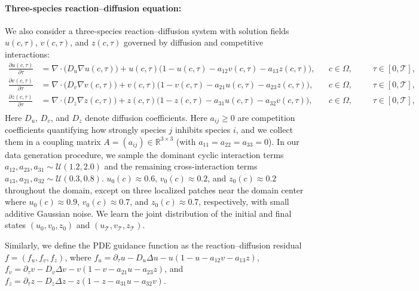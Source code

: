 \paragraph{Three-species reaction--diffusion equation:}
We also consider a three-species reaction--diffusion system with solution fields
$u(c,\tau)$, $v(c,\tau)$, and $z(c,\tau)$ governed by diffusion and competitive interactions:
\begin{equation}
\begin{aligned}
\frac{\partial u(c,\tau)}{\partial \tau} &=
\nabla\cdot\!\big(D_u \nabla u(c,\tau)\big)
+ u(c,\tau)\Big(1 - u(c,\tau) - a_{12}v(c,\tau) - a_{13}z(c,\tau)\Big),
&& c\in\Omega, &&&\tau\in[0,\mathcal{T}],\\
\frac{\partial v(c,\tau)}{\partial \tau} &=
\nabla\cdot\!\big(D_v \nabla v(c,\tau)\big)
+ v(c,\tau)\Big(1 - v(c,\tau) - a_{21}u(c,\tau) - a_{23}z(c,\tau)\Big),
&& c\in\Omega, &&&\tau\in[0,\mathcal{T}],\\
\frac{\partial z(c,\tau)}{\partial \tau} &=
\nabla\cdot\!\big(D_z \nabla z(c,\tau)\big)
+ z(c,\tau)\Big(1 - z(c,\tau) - a_{31}u(c,\tau) - a_{32}v(c,\tau)\Big),
&& c\in\Omega, &&&\tau\in[0,\mathcal{T}],\\
\end{aligned}
\label{eq:rd_3species}
\end{equation}
Here $D_u$, $D_v$, and $D_z$ denote diffusion coefficients. Here $a_{ij}\ge 0$ are competition coefficients quantifying how strongly species $j$ inhibits species $i$, and we collect them in a coupling matrix $A=(a_{ij})\in\mathbb{R}^{3\times 3}$ (with $a_{11}=a_{22}=a_{33}=0$). In our data generation procedure, we sample the dominant cyclic interaction terms $a_{12}, a_{23}, a_{31} \sim \mathcal{U}(1.2, 2.0)$ and the remaining cross-interaction terms $a_{13}, a_{21}, a_{32} \sim \mathcal{U}(0.3, 0.8)$. $u_0(c)\approx 0.6$, $v_0(c)\approx 0.2$, and $z_0(c)\approx 0.2$ throughout the domain, except on three localized patches near the domain center where $u_0(c)\approx 0.9$, $v_0(c)\approx 0.7$, and $z_0(c)\approx 0.7$, respectively, with small additive Gaussian noise. We learn the joint distribution of the initial and final states $(u_0,v_0,z_0)$ and $(u_{\mathcal{T}},v_{\mathcal{T}},z_{\mathcal{T}})$.


Similarly, we define the PDE guidance function as the reaction--diffusion residual $f=(f_u,f_v,f_z)$, where
$f_u = \partial_\tau u - D_u\Delta u - u(1-u-a_{12}v-a_{13}z)$,
$f_v = \partial_\tau v - D_v\Delta v - v(1-v-a_{21}u-a_{23}z)$, and
$f_z = \partial_\tau z - D_z\Delta z - z(1-z-a_{31}u-a_{32}v)$.

